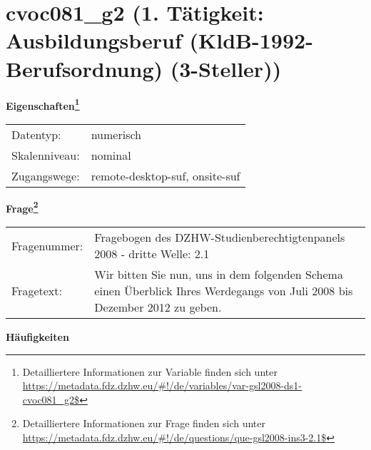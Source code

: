 
    \setcounter{footnote}{0}

    \vspace*{-1.8cm}
	\section{cvoc081\_g2 (1. Tätigkeit: Ausbildungsberuf (KldB-1992-Berufsordnung) (3-Steller))}
	\label{section:cvoc081_g2}



    \vspace*{0.5cm}
    \noindent\textbf{Eigenschaften\footnote{Detailliertere Informationen zur Variable finden sich unter
		\url{https://metadata.fdz.dzhw.eu/\#!/de/variables/var-gsl2008-ds1-cvoc081_g2$}}}\\
	\begin{tabularx}{\hsize}{@{}lX}
	Datentyp: & numerisch \\
	Skalenniveau: & nominal \\
	Zugangswege: &
	  remote-desktop-suf, 
	  onsite-suf
 \\
    \end{tabularx}



				\vspace*{0.5cm}
                \noindent\textbf{Frage\footnote{Detailliertere Informationen zur Frage finden sich unter
		              \url{https://metadata.fdz.dzhw.eu/\#!/de/questions/que-gsl2008-ins3-2.1$}}}\\
				\begin{tabularx}{\hsize}{@{}lX}
					Fragenummer: &
					  Fragebogen des DZHW-Studienberechtigtenpanels 2008 - dritte Welle:
					  2.1
 \\
					Fragetext: & Wir bitten Sie nun, uns in dem folgenden Schema einen Überblick Ihres Werdegangs von Juli 2008 bis Dezember 2012 zu geben. \\
				\end{tabularx}





        		\vspace*{0.5cm}
                \noindent\textbf{Häufigkeiten}

